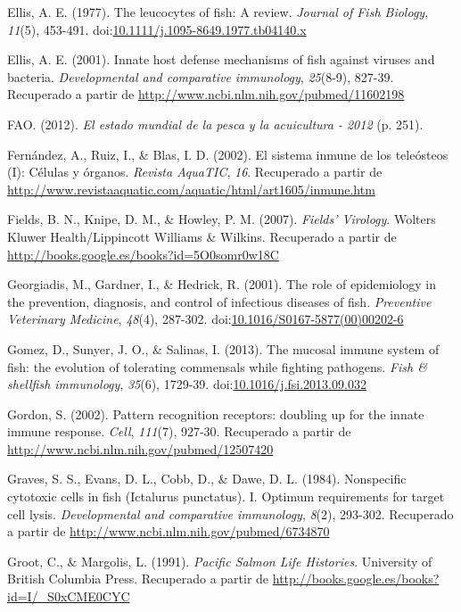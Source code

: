 \documentclass[12pt,letterpaper,oneside]{scrbook}
\begin{document}
Ellis, A. E. (1977). The leucocytes of fish: A review. \emph{Journal of
Fish Biology}, \emph{11}(5), 453-491.
doi:\href{http://dx.doi.org/10.1111/j.1095-8649.1977.tb04140.x}{10.1111/j.1095-8649.1977.tb04140.x}

Ellis, A. E. (2001). Innate host defense mechanisms of fish against
viruses and bacteria. \emph{Developmental and comparative immunology},
\emph{25}(8-9), 827-39. Recuperado a partir de
\url{http://www.ncbi.nlm.nih.gov/pubmed/11602198}

FAO. (2012). \emph{El estado mundial de la pesca y la acuicultura -
2012} (p. 251).

Fernández, A., Ruiz, I., \& Blas, I. D. (2002). El sistema inmune de los
teleósteos (I): Células y órganos. \emph{Revista AquaTIC}, \emph{16}.
Recuperado a partir de
\url{http://www.revistaaquatic.com/aquatic/html/art1605/inmune.htm}

Fields, B. N., Knipe, D. M., \& Howley, P. M. (2007). \emph{Fields'
Virology}. Wolters Kluwer Health/Lippincott Williams \& Wilkins.
Recuperado a partir de
\url{http://books.google.es/books?id=5O0somr0w18C}

Georgiadis, M., Gardner, I., \& Hedrick, R. (2001). The role of
epidemiology in the prevention, diagnosis, and control of infectious
diseases of fish. \emph{Preventive Veterinary Medicine}, \emph{48}(4),
287-302.
doi:\href{http://dx.doi.org/10.1016/S0167-5877(00)00202-6}{10.1016/S0167-5877(00)00202-6}

Gomez, D., Sunyer, J. O., \& Salinas, I. (2013). The mucosal immune
system of fish: the evolution of tolerating commensals while fighting
pathogens. \emph{Fish \& shellfish immunology}, \emph{35}(6), 1729-39.
doi:\href{http://dx.doi.org/10.1016/j.fsi.2013.09.032}{10.1016/j.fsi.2013.09.032}

Gordon, S. (2002). Pattern recognition receptors: doubling up for the
innate immune response. \emph{Cell}, \emph{111}(7), 927-30. Recuperado a
partir de \url{http://www.ncbi.nlm.nih.gov/pubmed/12507420}

Graves, S. S., Evans, D. L., Cobb, D., \& Dawe, D. L. (1984).
Nonspecific cytotoxic cells in fish (Ictalurus punctatus). I. Optimum
requirements for target cell lysis. \emph{Developmental and comparative
immunology}, \emph{8}(2), 293-302. Recuperado a partir de
\url{http://www.ncbi.nlm.nih.gov/pubmed/6734870}

Groot, C., \& Margolis, L. (1991). \emph{Pacific Salmon Life Histories}.
University of British Columbia Press. Recuperado a partir de
\url{http://books.google.es/books?id=I/_S0xCME0CYC}
\end{document}
